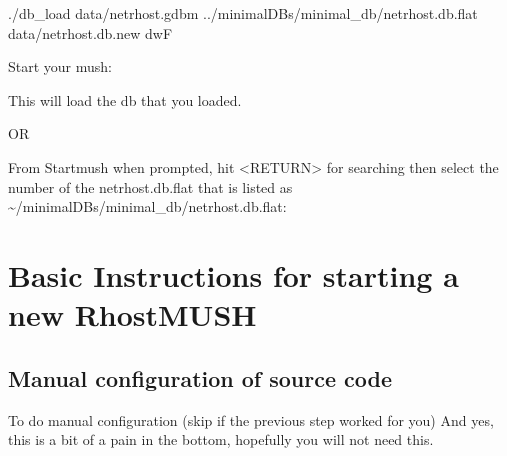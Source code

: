 \documentclass[letterpaper,10pt,english]{sphinxmanual}
\begin{document}
\begin{enumerate}
\sphinxAtStartPar
./db\_load data/netrhost.gdbm ../minimal\sphinxhyphen{}DBs/minimal\_db/netrhost.db.flat data/netrhost.db.new dwF

\sphinxAtStartPar
Start your mush:

\begin{sphinxVerbatim}[commandchars=\\\{\}]
\end{sphinxVerbatim}

\sphinxAtStartPar
This will load the db that you loaded.

\sphinxAtStartPar
\sphinxhyphen{}\sphinxhyphen{}\sphinxhyphen{}\sphinxhyphen{}\sphinxhyphen{}\sphinxhyphen{}\sphinxhyphen{}\sphinxhyphen{}\sphinxhyphen{}\sphinxhyphen{}\sphinxhyphen{}\sphinxhyphen{}\sphinxhyphen{}\sphinxhyphen{}\sphinxhyphen{}OR\sphinxhyphen{}\sphinxhyphen{}\sphinxhyphen{}\sphinxhyphen{}\sphinxhyphen{}\sphinxhyphen{}\sphinxhyphen{}

\sphinxAtStartPar
From Startmush when prompted, hit \textless{}RETURN\textgreater{} for searching then select the number of the netrhost.db.flat that is listed as \textasciitilde{}/minimal\sphinxhyphen{}DBs/minimal\_db/netrhost.db.flat:

\begin{sphinxVerbatim}[commandchars=\\\{\}]
\end{sphinxVerbatim}

\end{enumerate}


\section{Basic Instructions for starting a new RhostMUSH}
\label{\detokenize{install:basic-instructions-for-starting-a-new-rhostmush}}

\subsection{Manual configuration of source code}
\label{\detokenize{install:manual-configuration-of-source-code}}
\sphinxAtStartPar
To do manual configuration (skip if the previous step worked for you) And yes, this is a bit of a pain in the bottom, hopefully you will not need this.
\end{document}
